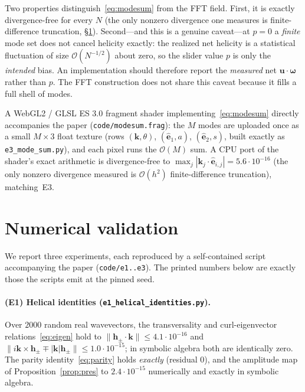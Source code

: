\documentclass[11pt]{article}
\theoremstyle{remark}
\newcommand{\bk}{\mathbf{k}}
\newcommand{\bu}{\mathbf{u}}
\newcommand{\bomega}{\boldsymbol{\omega}}
\newcommand{\he}{\mathbf{h}}
\newcommand{\ehat}{\hat{\mathbf{e}}}
\begin{document}
Two properties distinguish~\eqref{eq:modesum} from the FFT field. First, it is exactly
divergence-free for every $N$ (the only nonzero divergence one measures is
finite-difference truncation, \S\ref{sec:validation}). Second---and this is a genuine
caveat---at $p=0$ a \emph{finite} mode set does not cancel helicity exactly: the realized net
helicity is a statistical fluctuation of size $\mathcal O(N^{-1/2})$ about zero, so the slider
value $p$ is only the \emph{intended} bias. An implementation should therefore report the
\emph{measured} net $\bu\cdot\bomega$ rather than $p$. The FFT construction does not share this
caveat because it fills a full shell of modes.

A WebGL2 / GLSL ES 3.0 fragment shader implementing~\eqref{eq:modesum} directly
accompanies the paper (\texttt{code/modesum.frag}): the $M$ modes are uploaded
once as a small $M\times3$ float texture (rows $(\bk,\theta)$, $(\ehat_1,a)$,
$(\ehat_2,s)$, built exactly as \texttt{e3\_mode\_sum.py}), and each pixel runs
the $\mathcal O(M)$ sum. A CPU port of the shader's exact arithmetic is
divergence-free to $\max_j|\bk_j\cdot\ehat_{i,j}|=5.6\cdot10^{-16}$ (the only
nonzero divergence measured is $\mathcal O(h^2)$ finite-difference truncation),
matching~E3.

\section{Numerical validation}
\label{sec:validation}

We report three experiments, each reproduced by a self-contained script accompanying the
paper (\texttt{code/e1..e3}). The printed numbers below are exactly those the scripts emit at
the pinned seed.

\paragraph{(E1) Helical identities \textnormal{(\texttt{e1\_helical\_identities.py})}.}
Over $2000$ random real wavevectors, the transversality and curl-eigenvector
relations~\eqref{eq:eigen} hold to $\|\he_\pm\cdot\bk\|\le 4.1\cdot10^{-16}$ and
$\|i\bk\times\he_\pm\mp|\bk|\he_\pm\|\le1.0\cdot10^{-15}$; in symbolic algebra both are
identically zero. The parity identity~\eqref{eq:parity} holds \emph{exactly} (residual $0$),
and the amplitude map of Proposition~\ref{prop:pres} to $2.4\cdot10^{-15}$ numerically and
exactly in symbolic algebra.
\end{document}
